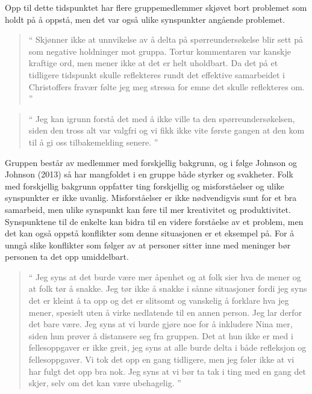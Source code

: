 Opp til dette tidspunktet har flere gruppemedlemmer skjøvet bort problemet som holdt på å oppstå, men det var også 
ulike synspunkter angående problemet.

\begin{quote}``
Skjønner ikke at unnvikelse av å delta på spørreundersøkelse blir sett på som negative holdninger mot gruppa. 
Tortur kommentaren var kanskje kraftige ord, men mener ikke at det er helt uholdbart. Da det på et tidligere tidspunkt skulle
reflekteres rundt det effektive samarbeidet i Christoffers fravær følte jeg meg stressa for emne det skulle reflekteres om.
''\end{quote} 

\begin{quote}``
Jeg kan igrunn forstå det med å ikke ville ta den spørreundersøkelsen, siden den 
tross alt var valgfri og vi fikk ikke vite første gangen at den kom til å gi oss tilbakemelding senere.
''\end{quote} 

Gruppen består av medlemmer med forskjellig bakgrunn, og i følge Johnson og Johnson (2013) så har mangfoldet i en gruppe 
både styrker og svakheter. Folk med forskjellig bakgrunn oppfatter ting forskjellig og misforståelser og ulike synspunkter er 
ikke uvanlig. Misforståelser er ikke nødvendigvis sunt for et bra samarbeid, men ulike synspunkt kan føre til mer kreativitet 
og produktivitet. \cite{Artikkel2} Synspunktene til de enkelte kan bidra til en videre forståelse av et problem, men det kan også oppstå 
konflikter som denne situasjonen er et eksempel på.
For å unngå slike konflikter som følger av at personer sitter inne med meninger bør personen ta det opp umiddelbart.

\begin{quote}``
Jeg syns at det burde være mer åpenhet og at folk sier hva de 
mener og at folk tør å snakke. Jeg tør ikke å snakke i sånne situasjoner fordi jeg syns det er kleint å ta opp og det 
er slitsomt og vanskelig å forklare hva jeg mener, spesielt uten å virke nedlatende til en annen person. Jeg lar derfor
det bare være. Jeg syns at vi burde gjøre noe for å inkludere Nina mer, siden hun prøver å distansere seg fra gruppen. 
Det at hun ikke er med i fellesoppgaver er ikke greit, jeg syns at alle burde delta i både refleksjon og 
fellesoppgaver. Vi tok det opp en gang tidligere, men jeg føler ikke at vi har fulgt det opp bra nok. Jeg syns at vi bør 
ta tak i ting med en gang det skjer, selv om det kan være ubehagelig.
''\end{quote} 

